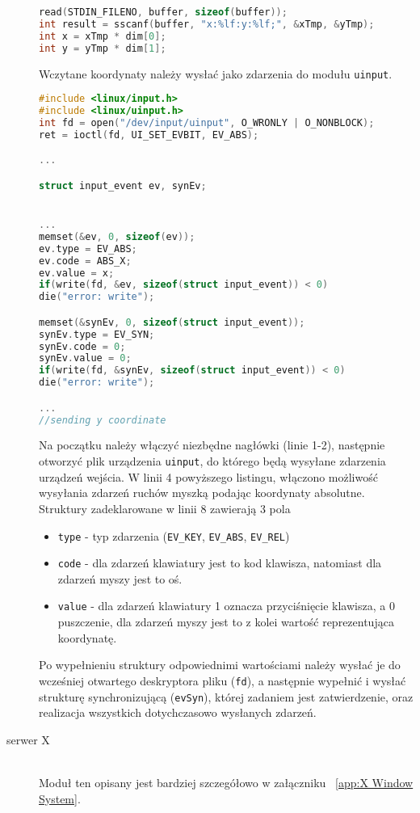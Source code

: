 \begin{description}
\begin{lstlisting}[language=c]
read(STDIN_FILENO, buffer, sizeof(buffer));
int result = sscanf(buffer, "x:%lf:y:%lf;", &xTmp, &yTmp);
int x = xTmp * dim[0];
int y = yTmp * dim[1];
\end{lstlisting}

Wczytane koordynaty należy wysłać jako zdarzenia do modułu \lstinline{uinput}. 

\begin{lstlisting}[language=c]
#include <linux/input.h>
#include <linux/uinput.h>
int fd = open("/dev/input/uinput", O_WRONLY | O_NONBLOCK);
ret = ioctl(fd, UI_SET_EVBIT, EV_ABS);

...

struct input_event ev, synEv;


...
memset(&ev, 0, sizeof(ev));
ev.type = EV_ABS;
ev.code = ABS_X;
ev.value = x;
if(write(fd, &ev, sizeof(struct input_event)) < 0)
die("error: write");  

memset(&synEv, 0, sizeof(struct input_event));
synEv.type = EV_SYN;
synEv.code = 0;
synEv.value = 0;
if(write(fd, &synEv, sizeof(struct input_event)) < 0)
die("error: write");

...
//sending y coordinate


\end{lstlisting}
		Na początku należy włączyć niezbędne nagłówki (linie 1-2), następnie otworzyć plik urządzenia \lstinline{uinput}, do którego będą wysyłane zdarzenia urządzeń wejścia. W linii 4 powyższego listingu, włączono możliwość wysyłania zdarzeń ruchów myszką podając koordynaty absolutne. Struktury zadeklarowane w linii 8 zawierają 3 pola 
\begin{itemize}
\item \lstinline{type} - typ zdarzenia (\lstinline{EV_KEY}, \lstinline{EV_ABS}, \lstinline{EV_REL})		
\item \lstinline{code} - dla zdarzeń klawiatury jest to kod klawisza, natomiast dla zdarzeń myszy jest to oś.
\item \lstinline{value} - dla zdarzeń klawiatury 1 oznacza przyciśnięcie klawisza, a 0 puszczenie, dla zdarzeń myszy jest to z kolei wartość reprezentująca koordynatę.
\end{itemize}
		Po wypełnieniu struktury odpowiednimi wartościami należy wysłać je do wcześniej otwartego deskryptora pliku (\lstinline{fd}), a następnie wypełnić i wysłać strukturę synchronizującą (\lstinline{evSyn}), której zadaniem jest zatwierdzenie, oraz realizacja wszystkich dotychczasowo wysłanych zdarzeń. 
	\item[serwer X] \hfill \\
		Moduł ten opisany jest bardziej szczegółowo w załączniku ~\ref{app:X Window System}.


\end{description}


